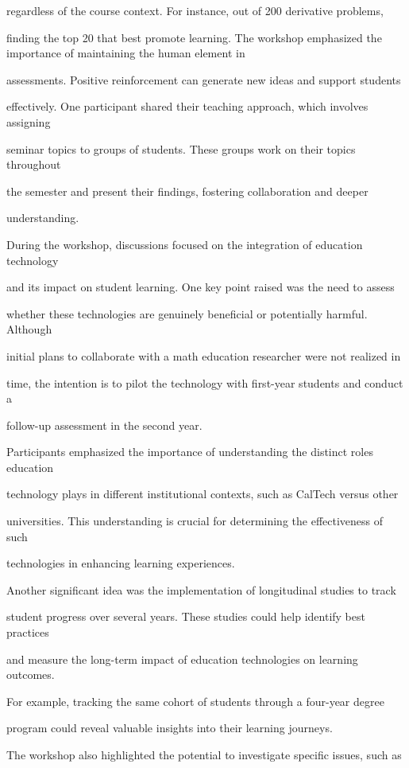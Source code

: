 \documentclass[11pt]{article}
\begin{document}
regardless of the course context. For instance, out of 200 derivative problems,

finding the top 20 that best promote learning. The workshop emphasized the importance of maintaining the human element in

assessments. Positive reinforcement can generate new ideas and support students

effectively. One participant shared their teaching approach, which involves assigning

seminar topics to groups of students. These groups work on their topics throughout

the semester and present their findings, fostering collaboration and deeper

understanding.

During the workshop, discussions focused on the integration of education technology

and its impact on student learning. One key point raised was the need to assess

whether these technologies are genuinely beneficial or potentially harmful. Although

initial plans to collaborate with a math education researcher were not realized in

time, the intention is to pilot the technology with first-year students and conduct a

follow-up assessment in the second year.

Participants emphasized the importance of understanding the distinct roles education

technology plays in different institutional contexts, such as CalTech versus other

universities. This understanding is crucial for determining the effectiveness of such

technologies in enhancing learning experiences.

Another significant idea was the implementation of longitudinal studies to track

student progress over several years. These studies could help identify best practices

and measure the long-term impact of education technologies on learning outcomes.

For example, tracking the same cohort of students through a four-year degree

program could reveal valuable insights into their learning journeys.

The workshop also highlighted the potential to investigate specific issues, such as
\end{document}
